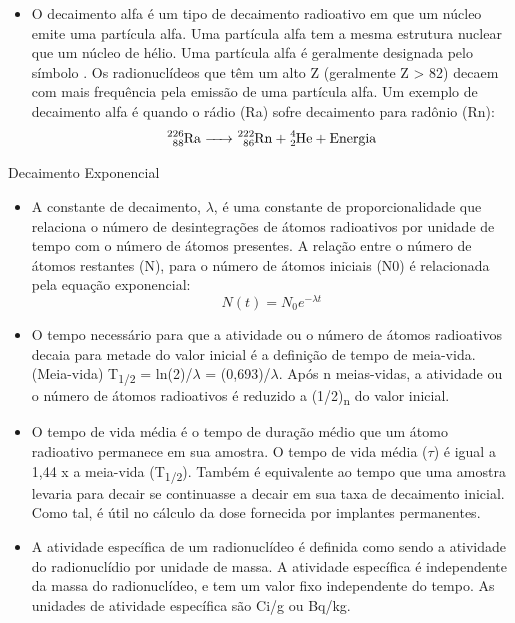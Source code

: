 \documentclass[11pt,a4paper]{article}
\newcounter{exemplo}
\begin{document}
\begin{exemplo}
\begin{itemize}
	   \item O decaimento alfa é um tipo de decaimento radioativo em que um núcleo emite uma partícula alfa. Uma partícula alfa tem a mesma estrutura nuclear que um núcleo de hélio. Uma partícula alfa é geralmente designada pelo símbolo . Os radionuclídeos que têm um alto Z (geralmente Z > 82) decaem com mais frequência pela emissão de uma partícula alfa. Um exemplo de decaimento alfa é quando o rádio (Ra) sofre decaimento para
	   radônio (Rn):
	   $$\ce{^{226}_{88}Ra -> ^{222}_{86}Rn + ^{4}_{2}He + Energia}$$
    \end{itemize}

	\textcolor{CarnationPink}{Decaimento Exponencial}

	\begin{itemize}
		\item A constante de decaimento, $\lambda$, é uma constante de proporcionalidade que relaciona o número de desintegrações de átomos radioativos por unidade de tempo com o número de átomos presentes. A relação entre o número de átomos restantes (N), para o número de átomos iniciais (N0) é relacionada pela equação exponencial:
		$$N(t) = N_0 e^{- \lambda t}$$

		\item O tempo necessário para que a atividade ou o número de átomos radioativos decaia para metade do valor inicial é a definição de tempo de meia-vida. (Meia-vida) T\textsubscript{1/2} = ln(2)/$\lambda$ = (0,693)/$\lambda$. Após n meias-vidas, a atividade ou o número de átomos radioativos é reduzido a (1/2)\textsubscript{n} do valor inicial.
		
		\item O tempo de vida média é o tempo de duração médio  que um átomo radioativo permanece em sua amostra. O tempo de vida média ($\tau$) é igual a 1,44 x a meia-vida (T\textsubscript{1/2}). Também é equivalente ao tempo que uma amostra levaria para decair se continuasse a decair em sua taxa de decaimento inicial. Como tal, é útil no cálculo da dose fornecida por implantes permanentes.
		
		\item A atividade específica de um radionuclídeo é definida como sendo a atividade do radionuclídio por unidade de massa. A atividade específica é independente da massa do radionuclídeo, e tem um valor fixo independente do tempo. As unidades de atividade específica são Ci/g ou Bq/kg.

	\end{itemize}
\end{exemplo}
\end{document}
